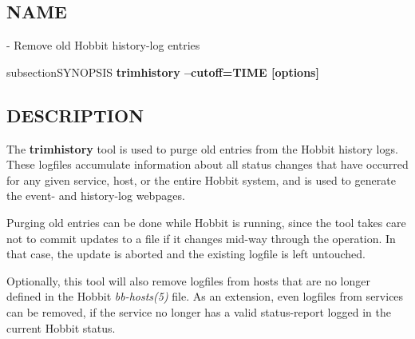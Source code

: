 \subsection{NAME}
  - Remove old Hobbit history-log entries 

subsection{SYNOPSIS}
\textbf{trimhistory --cutoff=TIME [options]}


 
\subsection{DESCRIPTION}
 The \textbf{trimhistory}
 tool is used to purge old entries from the Hobbit history logs. These
 logfiles accumulate information about all status changes that have
 occurred for any given service, host, or the entire Hobbit system,
 and is used to generate the event- and history-log webpages. 


  Purging old entries can be done while Hobbit is running, since the
  tool takes care not to commit updates to a file if it changes
  mid-way through the operation. In that case, the update is aborted
  and the existing logfile is left untouched. 



  Optionally, this tool will also remove logfiles from hosts that are
  no longer defined in the Hobbit \emph{bb-hosts(5)} file. As an
  extension, even logfiles from services can be removed, if the
  service no longer has a valid status-report logged in the current
  Hobbit status. 



 
